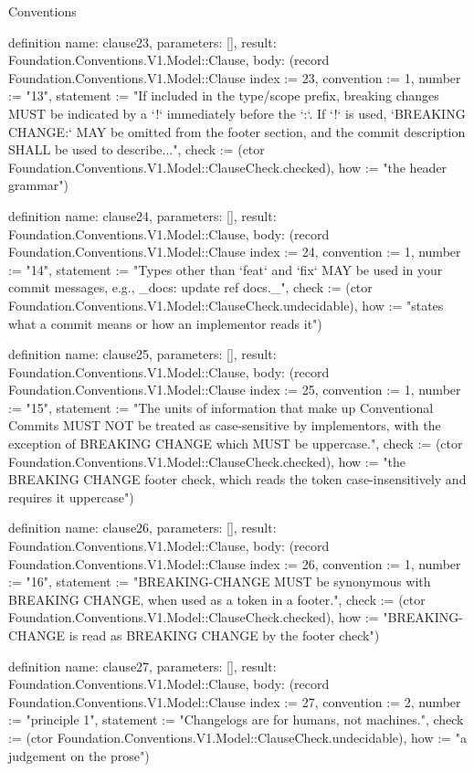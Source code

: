 \begin{lexlean}{Conventions}
\begin{semanticmodule}
definition{
  name: clause23,
  parameters: [],
  result: Foundation.Conventions.V1.Model::Clause,
  body: (record Foundation.Conventions.V1.Model::Clause {index := 23, convention := 1, number := "13", statement := "If included in the type/scope prefix, breaking changes MUST be indicated by a `!` immediately before the `:`. If `!` is used, `BREAKING CHANGE:` MAY be omitted from the footer section, and the commit description SHALL be used to describe...", check := (ctor Foundation.Conventions.V1.Model::ClauseCheck.checked), how := "the header grammar"})
}

definition{
  name: clause24,
  parameters: [],
  result: Foundation.Conventions.V1.Model::Clause,
  body: (record Foundation.Conventions.V1.Model::Clause {index := 24, convention := 1, number := "14", statement := "Types other than `feat` and `fix` MAY be used in your commit messages, e.g., _docs: update ref docs._", check := (ctor Foundation.Conventions.V1.Model::ClauseCheck.undecidable), how := "states what a commit means or how an implementor reads it"})
}

definition{
  name: clause25,
  parameters: [],
  result: Foundation.Conventions.V1.Model::Clause,
  body: (record Foundation.Conventions.V1.Model::Clause {index := 25, convention := 1, number := "15", statement := "The units of information that make up Conventional Commits MUST NOT be treated as case-sensitive by implementors, with the exception of BREAKING CHANGE which MUST be uppercase.", check := (ctor Foundation.Conventions.V1.Model::ClauseCheck.checked), how := "the BREAKING CHANGE footer check, which reads the token case-insensitively and requires it uppercase"})
}

definition{
  name: clause26,
  parameters: [],
  result: Foundation.Conventions.V1.Model::Clause,
  body: (record Foundation.Conventions.V1.Model::Clause {index := 26, convention := 1, number := "16", statement := "BREAKING-CHANGE MUST be synonymous with BREAKING CHANGE, when used as a token in a footer.", check := (ctor Foundation.Conventions.V1.Model::ClauseCheck.checked), how := "BREAKING-CHANGE is read as BREAKING CHANGE by the footer check"})
}

definition{
  name: clause27,
  parameters: [],
  result: Foundation.Conventions.V1.Model::Clause,
  body: (record Foundation.Conventions.V1.Model::Clause {index := 27, convention := 2, number := "principle 1", statement := "Changelogs are for humans, not machines.", check := (ctor Foundation.Conventions.V1.Model::ClauseCheck.undecidable), how := "a judgement on the prose"})
}


\end{semanticmodule}
\end{lexlean}
